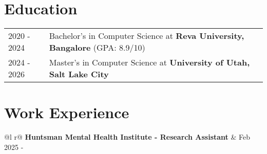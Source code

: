 \documentclass[a4paper, 11pt]{article}
\begin{document}
	\section{Education}
	\begin{tabularx}{\linewidth}{@{}l X@{}}	
		
		2020 - 2024 & Bachelor's in Computer Science at \textbf{Reva University, Bangalore} \hfill (GPA: 8.9/10) \\ 

        2024 - 2026 & Master's in Computer Science at \textbf{University of Utah, Salt Lake City} \hfill 
		
	\end{tabularx}
	

	
	\section{Work Experience}


	\begin{tabularx}{\linewidth}{ @{}l r@{} }
		\textbf{Huntsman Mental Health Institute - Research Assistant} & \hfill Feb 2025 -  \\[3.75pt]
	\end{tabularx}
\end{document}
